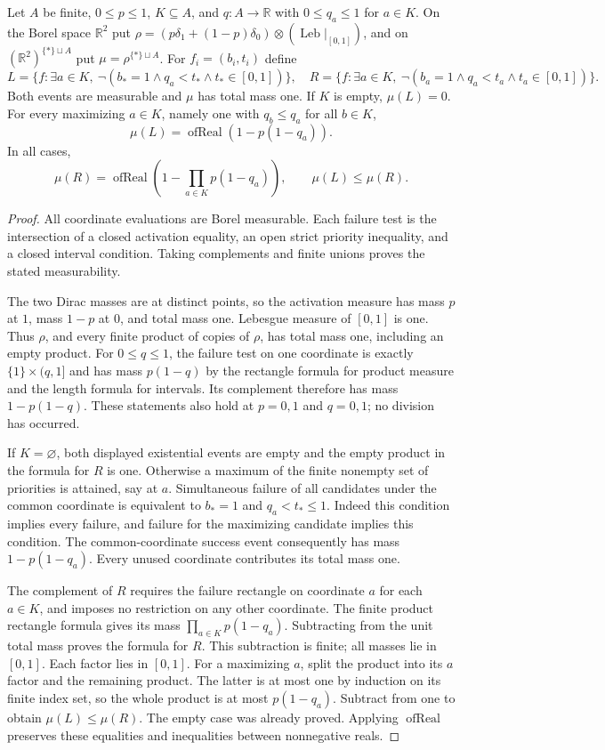 \begin{lemma}
Let $A$ be finite, $0\le p\le1$, $K\subseteq A$, and $q:A\to\mathbb R$
with $0\le q_a\le1$ for $a\in K$. On the Borel space $\mathbb R^2$ put
$\rho=(p\delta_1+(1-p)\delta_0)\otimes(\operatorname{Leb}|_{[0,1]})$,
and on $(\mathbb R^2)^{\{*\}\sqcup A}$ put $\mu=\rho^{\{*\}\sqcup A}$.
For $f_i=(b_i,t_i)$ define
\[
 L=\{f:\exists a\in K,\ \neg(b_*=1\land q_a<t_*\land t_*\in[0,1])\},
\quad
 R=\{f:\exists a\in K,\ \neg(b_a=1\land q_a<t_a\land t_a\in[0,1])\}.
\]
Both events are measurable and $\mu$ has total mass one. If $K$ is empty,
$\mu(L)=0$. For every maximizing $a\in K$, namely one with
$q_b\le q_a$ for all $b\in K$,
\[
 \mu(L)=\operatorname{ofReal}(1-p(1-q_a)).
\]
In all cases,
\[
 \mu(R)=\operatorname{ofReal}\left(1-\prod_{a\in K}p(1-q_a)\right),
 \qquad \mu(L)\le\mu(R).
\]
\end{lemma}
\begin{proof}
All coordinate evaluations are Borel measurable. Each failure test is the
intersection of a closed activation equality, an open strict priority
inequality, and a closed interval condition. Taking complements and finite
unions proves the stated measurability.

The two Dirac masses are at distinct points, so the activation measure has
mass $p$ at $1$, mass $1-p$ at $0$, and total mass one. Lebesgue measure of
$[0,1]$ is one. Thus $\rho$, and every finite product of copies of $\rho$,
has total mass one, including an empty product. For $0\le q\le1$, the
failure test on one coordinate is exactly $\{1\}\times(q,1]$ and has
mass $p(1-q)$ by the rectangle formula for product measure and the length
formula for intervals. Its complement therefore has mass $1-p(1-q)$.
These statements also hold at $p=0,1$ and $q=0,1$; no division has occurred.

If $K=\varnothing$, both displayed existential events are empty and the
empty product in the formula for $R$ is one. Otherwise a maximum of the
finite nonempty set of priorities is attained, say at $a$. Simultaneous
failure of all candidates under the common coordinate is equivalent to
$b_*=1$ and $q_a<t_*\le1$. Indeed this condition implies every failure,
and failure for the maximizing candidate implies this condition. The
common-coordinate success event consequently has mass $1-p(1-q_a)$.
Every unused coordinate contributes its total mass one.

The complement of $R$ requires the failure rectangle on coordinate $a$
for each $a\in K$, and imposes no restriction on any other coordinate.
The finite product rectangle formula gives its mass
$\prod_{a\in K}p(1-q_a)$. Subtracting from the unit total mass proves
the formula for $R$. This subtraction is finite; all masses lie in $[0,1]$.
Each factor lies in $[0,1]$. For a maximizing $a$, split the product into
its $a$ factor and the remaining product. The latter is at most one by
induction on its finite index set, so the whole product is at most
$p(1-q_a)$. Subtract from one to obtain $\mu(L)\le\mu(R)$.
The empty case was already proved. Applying $\operatorname{ofReal}$
preserves these equalities and inequalities between nonnegative reals.
\end{proof}

